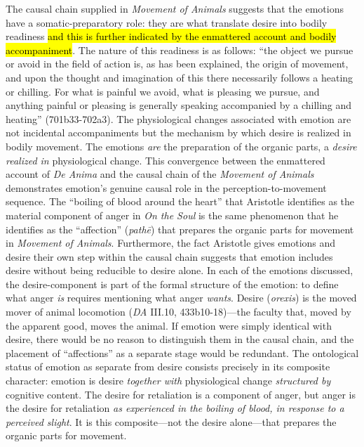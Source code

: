 \documentclass{article}
\begin{document}
The causal chain supplied in \textit{Movement of Animals} suggests that the emotions have a somatic-preparatory role: they are what translate desire into bodily readiness \hl{and this is further indicated by the enmattered account and bodily accompaniment}. The nature of this readiness is as follows: ``the object we pursue or avoid in the field of action is, as has been explained, the origin of movement, and upon the thought and imagination of this there necessarily follows a heating or chilling. For what is painful we avoid, what is pleasing we pursue, and anything painful or pleasing is generally speaking accompanied by a chilling and heating'' (701b33-702a3). The physiological changes associated with emotion are not incidental accompaniments but the mechanism by which desire is realized in bodily movement. The emotions \textit{are} the preparation of the organic parts, a \textit{desire realized in} physiological change. This convergence between the enmattered account of \textit{De Anima} and the causal chain of the \textit{Movement of Animals} demonstrates emotion's genuine causal role in the perception-to-movement sequence. The ``boiling of blood around the heart'' that Aristotle identifies as the material component of anger in \textit{On the Soul} is the same phenomenon that he identifies as the ``affection'' (\textit{pathē}) that prepares the organic parts for movement in \textit{Movement of Animals}. Furthermore, the fact Aristotle gives emotions and desire their own step within the causal chain suggests that emotion includes desire without being reducible to desire alone. In each of the emotions discussed, the desire-component is part of the formal structure of the emotion: to define what anger \textit{is} requires mentioning what anger \textit{wants}. Desire (\textit{orexis}) is the moved mover of animal locomotion (\textit{DA} III.10, 433b10-18)---the faculty that, moved by the apparent good, moves the animal. If emotion were simply identical with desire, there would be no reason to distinguish them in the causal chain, and the placement of ``affections'' as a separate stage would be redundant. The ontological status of emotion as separate from desire consists precisely in its composite character: emotion is desire \textit{together with} physiological change \textit{structured by} cognitive content. The desire for retaliation is a component of anger, but anger is the desire for retaliation \textit{as experienced in the boiling of blood, in response to a perceived slight}. It is this composite---not the desire alone---that prepares the organic parts for movement. 
\end{document}
